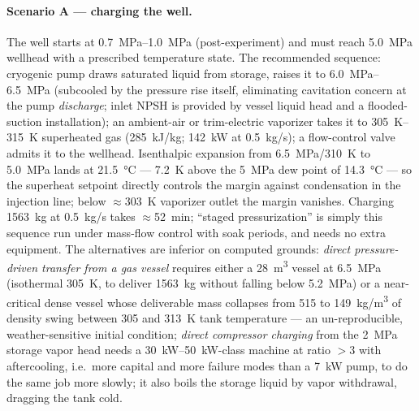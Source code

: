 \paragraph{Scenario A --- charging the well.} The well starts at
\SIrange{0.7}{1.0}{MPa} (post-experiment) and must reach
\SI{5.0}{MPa} wellhead with a prescribed temperature state. The
recommended sequence: cryogenic pump draws saturated liquid from
storage, raises it to \SIrange{6.0}{6.5}{MPa} (subcooled by the
pressure rise itself, eliminating cavitation concern at the pump
\emph{discharge}; inlet NPSH is provided by vessel liquid head and a
flooded-suction installation); an ambient-air or trim-electric
vaporizer takes it to \SIrange{305}{315}{K} superheated gas
(\SI{285}{kJ/kg}; \SI{142}{kW} at \SI{0.5}{kg/s}); a flow-control
valve admits it to the wellhead. Isenthalpic expansion from
\SI{6.5}{MPa}/\SI{310}{K} to \SI{5.0}{MPa} lands at \SI{21.5}{\celsius}
--- \SI{7.2}{K} above the \SI{5}{MPa} dew point of
\SI{14.3}{\celsius} --- so the superheat setpoint directly controls
the margin against condensation in the injection line; below
$\approx$\SI{303}{K} vaporizer outlet the margin vanishes. Charging
\SI{1563}{kg} at \SI{0.5}{kg/s} takes $\approx$\SI{52}{min};
``staged pressurization'' is simply this sequence run under
mass-flow control with soak periods, and needs no extra equipment.
The alternatives are inferior on computed grounds: \emph{direct
pressure-driven transfer from a gas vessel} requires either a
\SI{28}{m^3} vessel at \SI{6.5}{MPa} (isothermal \SI{305}{K}, to
deliver \SI{1563}{kg} without falling below \SI{5.2}{MPa}) or a
near-critical dense vessel whose deliverable mass collapses from
515 to \SI{149}{kg/m^3} of density swing between \SI{305}{} and
\SI{313}{K} tank temperature --- an un-reproducible, weather-sensitive
initial condition; \emph{direct compressor charging} from the
\SI{2}{MPa} storage vapor head needs a \SIrange{30}{50}{kW}-class
machine at ratio $>3$ with aftercooling, i.e.\ more capital and more
failure modes than a \SI{7}{kW} pump, to do the same job more slowly;
it also boils the storage liquid by vapor withdrawal, dragging the
tank cold.

